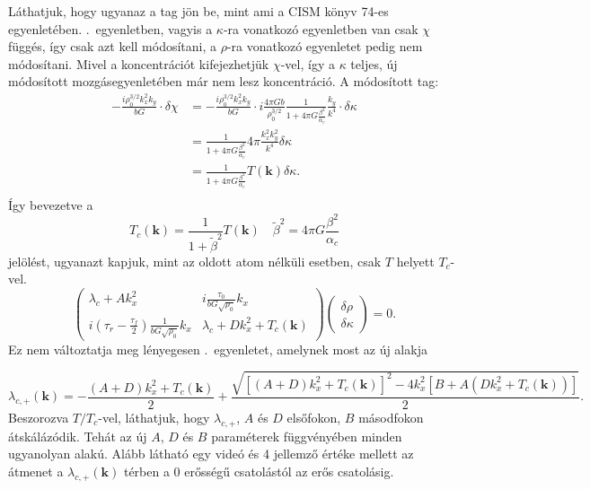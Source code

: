 \documentclass[10pt,a4paper]{scrartcl}
\let\mathbf\bm
\begin{document}
Láthatjuk, hogy ugyanaz a tag jön be, mint ami a CISM könyv 74-es egyenletében. .\ egyenletben, vagyis a $\kappa$-ra vonatkozó egyenletben van csak $\chi$ függés, így csak azt kell módosítani, a $\rho$-ra vonatkozó egyenletet pedig nem módosítani. Mivel a koncentrációt kifejezhetjük $\chi$-vel, így a $\kappa$ teljes, új módosított mozgásegyenletében már nem lesz koncentráció. A módosított tag:
\[\begin{aligned}
   - \frac{{i\rho _0^{3/2}k_x^2{k_y}}}{{bG}} \cdot \delta \chi  &  =  - \frac{{i\rho _0^{3/2}k_x^2{k_y}}}{{bG}} \cdot i\frac{{4\pi Gb}}{{\rho _0^{3/2}}}\frac{1}{{1 + 4\pi G\frac{{{\beta ^2}}}{{{\alpha _c}}}}}\frac{{{k_y}}}{{{k^4}}} \cdot \delta \kappa  \\ 
   &  = \frac{1}{{1 + 4\pi G\frac{{{\beta ^2}}}{{{\alpha _c}}}}}4\pi \frac{{k_x^2k_y^2}}{{{k^4}}}\delta \kappa  \\ 
   &  = \frac{1}{{1 + 4\pi G\frac{{{\beta ^2}}}{{{\alpha _c}}}}}T\left( {\mathbf{k}} \right)\delta \kappa.  \\ 
\end{aligned} \]
Így bevezetve a
\[{T_c}\left( {\mathbf{k}} \right) = \frac{1}{{1 + \tilde \beta^2}}T\left( {\mathbf{k}} \right)\quad \tilde \beta^2 = 4\pi G\frac{{{\beta ^2}}}{{{\alpha _c}}}\]
jelölést, ugyanazt kapjuk, mint az oldott atom nélküli esetben, csak $T$ helyett $T_c$-vel.
\begin{equation*}
\left({\begin{array}{*{20}{c}}
  {\lambda_c  + Ak_x^2}&{i\frac{{{\tau _0}}}{{bG\sqrt {{\rho _0}} }}{k_x}} \\ 
  {i\left( {{\tau _r} - \frac{{{\tau _f}}}{2}} \right)\frac{1}{{bG\sqrt {{\rho _0}} }}{k_x}}&{\lambda_c  + Dk_x^2 + {T_c}\left( {\mathbf{k}} \right)}
\end{array}} \right)\left( {\begin{array}{*{20}{c}}
  {\delta \rho } \\ 
  {\delta \kappa }
\end{array}} \right) = 0.
\end{equation*}
Ez nem változtatja meg lényegesen .\ egyenletet, amelynek most az új alakja

\begin{equation} \label{eq:lambda_c_k}
{\lambda _{c, + }}\left( {\mathbf{k}} \right) =  - \frac{{\left( {A + D} \right)k_x^2 + {T_c}\left( {\mathbf{k}} \right)}}{2} + \frac{{\sqrt {{{\left[ {\left( {A + D} \right)k_x^2 + {T_c}\left( {\mathbf{k}} \right)} \right]}^2} - 4k_x^2\left[ {B  + A\left( {Dk_x^2 + {T_c}\left( {\mathbf{k}} \right)} \right)} \right]} }}{2}.
\end{equation}
Beszorozva $T/T_c$-vel, láthatjuk, hogy $\lambda_{c,+}$, $A$ és $D$ elsőfokon, $B$ másodfokon átskálázódik. Tehát az új $A$, $D$ és $B$ paraméterek függvényében minden ugyanolyan alakú. Alább látható egy videó és 4 jellemző értéke mellett az átmenet a ${\lambda _{c, + }}\left( {\mathbf{k}} \right)$ térben a 0 erősségű csatolástól az erős csatolásig.
\end{document}
